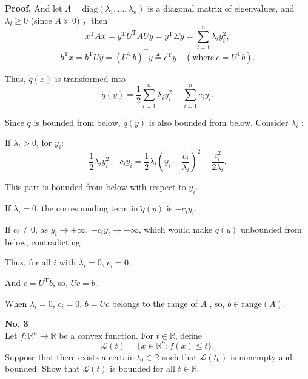 \documentclass[a4paper, 11pt]{article}
\newenvironment{problem}[2][No.]
    { \begin{mdframed}[backgroundcolor=gray!5] \textbf{#1 #2} \\}
    {  \end{mdframed}}
\newenvironment{solution}
    {\textbf{Proof.}}
    {}
\begin{document}
\begin{solution}
And let \( \Lambda = \text{diag}(\lambda_1, \ldots, \lambda_n) \) is a diagonal matrix of eigenvalues, and \( \lambda_i \geq 0 \) (since \( A \succeq 0 \)) ，then
$$
x^{\mathrm{T}}Ax = y^{\mathrm{T}}U^{\mathrm{T}}AUy = y^{\mathrm{T}}\Sigma y = \sum_{i=1}^n \lambda_i y_i^2,
$$ 
$$
b^{\mathrm{T}}x = b^{\mathrm{T}}Uy = (U^{\mathrm{T}}b)^{\mathrm{T}}y \triangleq c^{\mathrm{T}}y \quad (\text{where} \ c = U^{\mathrm{T}}b).
$$ 

Thus, \( q(x) \) is transformed into  
$$
\tilde{q}(y) = \frac{1}{2} \sum_{i=1}^n \lambda_i y_i^2 - \sum_{i=1}^n c_i y_i.
$$

Since \( q \) is bounded from below, \( \tilde{q}(y) \) is also bounded from below. Consider \( \lambda_i \) :  


If \( \lambda_i > 0 \), for \( y_i \):  
$$
	\frac{1}{2}\lambda_i y_i^2 - c_i y_i = \frac{1}{2}\lambda_i \left( y_i - \frac{c_i}{\lambda_i} \right)^2 - \frac{c_i^2}{2\lambda_i}.
$$

This part is bounded from below with respect to \( y_i \).  
	
If \( \lambda_i = 0 \), the corresponding term in \( \tilde{q}(y) \) is \( -c_i y_i \). 

If \( c_i \neq 0 \), as \( y_i \to \pm\infty \), \( -c_i y_i \to -\infty \), which would make \( \tilde{q}(y) \) unbounded from below, contradicting. 

Thus, for all \( i \) with \( \lambda_i = 0 \),  \( c_i = 0 \). 
	 
And \( c = U^{\mathrm{T}} b \), so, \( Uc = b \). 

When \( \lambda_i = 0 \), \( c_i = 0 \), \( b = Uc \) belongs to the range of \( A \) , so, \( b \in \text{range}(A) \). 

\end{solution}


\begin{problem}{3}
	Let \( f : \mathbb{R}^n \to \mathbb{R} \) be a convex function. For \( t \in \mathbb{R} \), define
$$
	\mathcal{L}(t) = \{ x \in \mathbb{R}^n : f(x) \leq t \}.
$$
	Suppose that there exists a certain \( t_0 \in \mathbb{R} \) such that \( \mathcal{L}(t_0) \) is nonempty and bounded. Show that \( \mathcal{L}(t) \) is bounded for all \( t \in \mathbb{R} \).
\end{problem}
\end{document}
